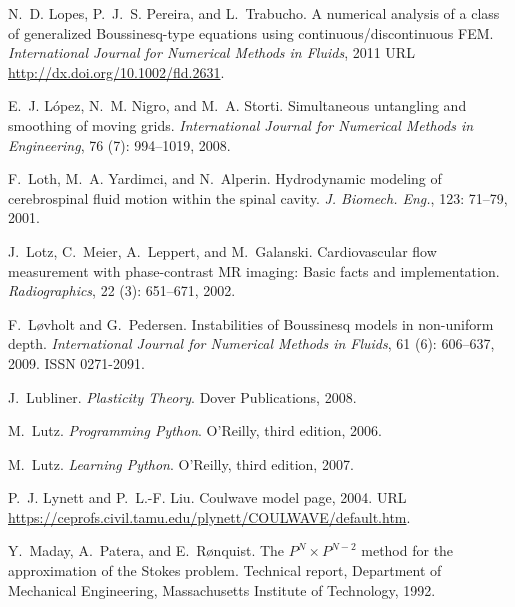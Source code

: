\begin{thebibliography}{467}
N.~D. Lopes, P.~J.~S. Pereira, and L.~Trabucho.
\newblock A numerical analysis of a class of generalized {B}oussinesq-type
  equations using continuous/discontinuous {FEM}.
\newblock \emph{International Journal for Numerical Methods in Fluids}, 2011
\newblock  URL \url{http://dx.doi.org/10.1002/fld.2631}.

E.~J. L\'{o}pez, N.~M. Nigro, and M.~A. Storti.
\newblock Simultaneous untangling and smoothing of moving grids.
\newblock \emph{International Journal for Numerical Methods in Engineering},
  76 (7): 994--1019, 2008.

F.~Loth, M.~A. Yardimci, and N.~Alperin.
\newblock Hydrodynamic modeling of cerebrospinal fluid motion within the spinal
  cavity.
\newblock \emph{J. Biomech. Eng.}, 123: 71--79, 2001.

J.~Lotz, C.~Meier, A.~Leppert, and M.~Galanski.
\newblock Cardiovascular flow measurement with phase-contrast {MR} imaging:
  {B}asic facts and implementation.
\newblock \emph{Radiographics}, 22 (3): 651--671, 2002.

F.~L{\o}vholt and G.~Pedersen.
\newblock Instabilities of {B}oussinesq models in non-uniform depth.
\newblock \emph{International Journal for Numerical Methods in Fluids},
  61 (6): 606--637, 2009.
\newblock ISSN 0271-2091.

J.~Lubliner.
\newblock \emph{Plasticity Theory}.
\newblock Dover Publications, 2008.

M.~Lutz.
\newblock \emph{Programming Python}.
\newblock O'Reilly, third edition, 2006.

M.~Lutz.
\newblock \emph{Learning Python}.
\newblock O'Reilly, third edition, 2007.

P.~J. Lynett and P.~L.-F. Liu.
\newblock Coulwave model page, 2004.
\newblock URL
  \url{https://ceprofs.civil.tamu.edu/plynett/COULWAVE/default.htm}.

Y.~Maday, A.~Patera, and E.~R{\o}nquist.
\newblock The {$P^N \times P^{N-2}$} method for the approximation of the
  {S}tokes problem.
\newblock Technical report, Department of Mechanical Engineering, Massachusetts
  Institute of Technology, 1992.


\end{thebibliography}
